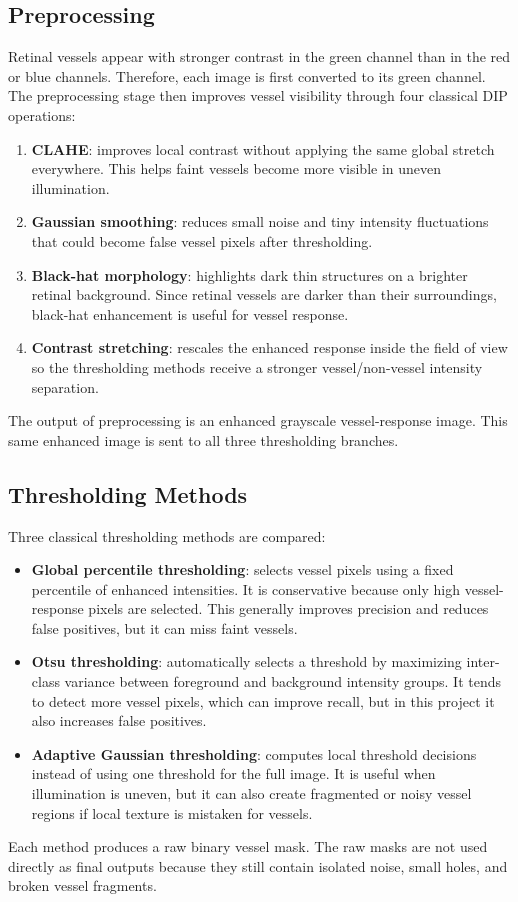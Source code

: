\documentclass[12pt,a4paper]{article}
\begin{document}
\subsection{Preprocessing}
Retinal vessels appear with stronger contrast in the green channel than in the red or blue channels. Therefore, each image is first converted to its green channel. The preprocessing stage then improves vessel visibility through four classical DIP operations:
\begin{enumerate}
    \item \textbf{CLAHE}: improves local contrast without applying the same global stretch everywhere. This helps faint vessels become more visible in uneven illumination.
    \item \textbf{Gaussian smoothing}: reduces small noise and tiny intensity fluctuations that could become false vessel pixels after thresholding.
    \item \textbf{Black-hat morphology}: highlights dark thin structures on a brighter retinal background. Since retinal vessels are darker than their surroundings, black-hat enhancement is useful for vessel response.
    \item \textbf{Contrast stretching}: rescales the enhanced response inside the field of view so the thresholding methods receive a stronger vessel/non-vessel intensity separation.
\end{enumerate}
The output of preprocessing is an enhanced grayscale vessel-response image. This same enhanced image is sent to all three thresholding branches.

\subsection{Thresholding Methods}
Three classical thresholding methods are compared:
\begin{itemize}
    \item \textbf{Global percentile thresholding}: selects vessel pixels using a fixed percentile of enhanced intensities. It is conservative because only high vessel-response pixels are selected. This generally improves precision and reduces false positives, but it can miss faint vessels.
    \item \textbf{Otsu thresholding}: automatically selects a threshold by maximizing inter-class variance between foreground and background intensity groups. It tends to detect more vessel pixels, which can improve recall, but in this project it also increases false positives.
    \item \textbf{Adaptive Gaussian thresholding}: computes local threshold decisions instead of using one threshold for the full image. It is useful when illumination is uneven, but it can also create fragmented or noisy vessel regions if local texture is mistaken for vessels.
\end{itemize}
Each method produces a raw binary vessel mask. The raw masks are not used directly as final outputs because they still contain isolated noise, small holes, and broken vessel fragments.
\end{document}
